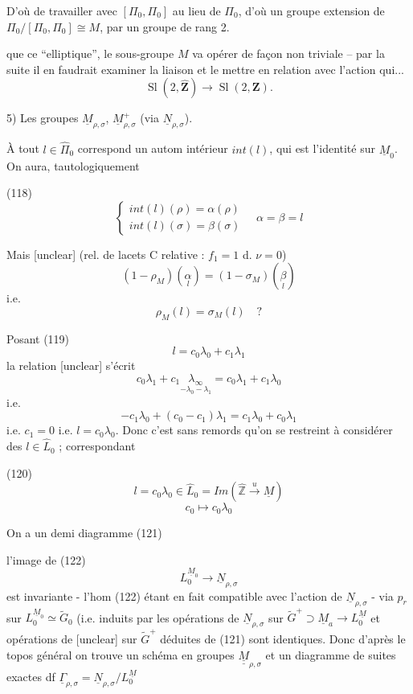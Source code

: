 D'où de travailler avec $[\Pi_0, \Pi_0]$ au lieu de $\Pi_0$, d'où un groupe extension de $\Pi_0/[\Pi_0, \Pi_0] \cong M$, par un groupe de rang 2.

 que ce ``elliptique'', le sous-groupe $M$ va opérer de façon non triviale -- par la suite il en faudrait examiner la liaison et le mettre en relation avec l'action qui...
$$\operatorname{Sl}(2, \hat{\mathbf{Z}}) \to \operatorname{Sl}(2, \mathbf{Z}).$$

\newpage


5) Les groupes $\underline{M}_{\rho,\sigma}$, $\underline{M}_{\rho,\sigma}^+$ (via $\underline{N}_{\rho,\sigma}$).

À tout $l \in \hat{\Pi}_0$ correspond un autom
intérieur $int(l)$, qui est l'identité sur
$\underline{M}_0$. On aura, tautologiquement

(118) $$ \begin{cases} int(l)(\rho) = \alpha(\rho) \\ int(l)(\sigma) = \beta(\sigma) \end{cases} \quad \alpha = \beta = l $$

Mais [unclear] (rel. de lacets C relative : $f_1=1$ d. $\nu=0$)
$$ (1-\rho_M)(\underset{l}{\alpha}) = (1-\sigma_M)(\underset{l}{\beta}) $$
i.e.
$$ \rho_M(l) = \sigma_M(l) \quad ? $$

Posant 
(119) $$ l = c_0 \lambda_0 + c_1 \lambda_1 $$
la relation [unclear] s'écrit
$$ c_0 \lambda_1 + c_1 \underset{-\lambda_0-\lambda_1}{\lambda_\infty} = c_0 \lambda_1 + c_1 \lambda_0 $$
i.e.
$$ - c_1 \lambda_0 + (c_0 - c_1) \lambda_1 = c_1 \lambda_0 + c_0 \lambda_1 $$
i.e. $c_1=0$ i.e. $l = c_0 \lambda_0$. Donc c'est
sans remords qu'on se restreint à
considérer des $l \in \widehat{L}_0$ ; correspondant

(120) $$ l = c_0 \lambda_0 \in \widehat{L}_0 = Im (\hat{\mathbb{Z}} \xrightarrow{u} \underline{M}) $$
$$ c_0 \mapsto c_0 \lambda_0 $$

On a un demi diagramme
(121) 

\newpage


l'image de
(122) $$L_0^{\underline{M}_0} \to \underline{N}_{\rho,\sigma}$$
est invariante - l'hom (122) étant en
fait compatible avec l'action de $\underline{N}_{\rho,\sigma}$
- via $p_r$ sur $L_0^{\underline{M}_0} \simeq \tilde{G}_0$ (i.e. induits
par les opérations de $\underline{N}_{\rho,\sigma}$ sur $\tilde{G}^+ \supset \underline{M}_a \to L_0^{\underline{M}}$
et opérations de [unclear] sur $\tilde{G}^+$ déduites
de (121) sont identiques. Donc d'après
le topos général on trouve un
schéma en groupes $\underline{\underline{M}}_{\rho,\sigma}$ et un
diagramme de suites exactes df $\underline{\Gamma}_{\rho,\sigma} = \underline{N}_{\rho,\sigma}/L_0^{\underline{M}}$

